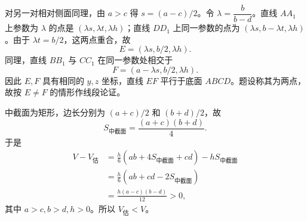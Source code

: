 \begin{answer}

对另一对相对侧面同理，由 \(a>c\) 得 \(s=(a-c)/2\)。令 \(\lambda=\dfrac{b}{b-d}\)。直线 \(AA_1\) 上参数为 \(\lambda\) 的点是 \((\lambda s,\lambda t,\lambda h)\)；直线 \(DD_1\) 上同一参数的点为 \((\lambda s,b-\lambda t,\lambda h)\)。由于 \(\lambda t=b/2\)，这两点重合，故
\nopagebreak[4]
\[
E=(\lambda s,b/2,\lambda h).
\]
同理，直线 \(BB_1\) 与 \(CC_1\) 在同一参数处相交于
\nopagebreak[4]
\[
F=(a-\lambda s,b/2,\lambda h).
\]
因此 \(E,F\) 具有相同的 \(y,z\) 坐标，直线 \(EF\) 平行于底面 \(ABCD\)。题设称其为两点，故按 \(E\ne F\) 的情形作线段论证。


中截面为矩形，边长分别为 \((a+c)/2\) 和 \((b+d)/2\)，故
\nopagebreak[4]
\[
S_{\text{中截面}}=\frac{(a+c)(b+d)}4.
\]
于是
\nopagebreak[4]
\[
\begin{aligned}
V-V_{\text{估}}
&=\frac h6\left(ab+4S_{\text{中截面}}+cd\right)-hS_{\text{中截面}}\\
&=\frac h6\left(ab+cd-2S_{\text{中截面}}\right)\\
&=\frac{h(a-c)(b-d)}{12}>0,
\end{aligned}
\]
其中 \(a>c,b>d,h>0\)。所以 \(V_{\text{估}}<V\)。




\end{answer}
